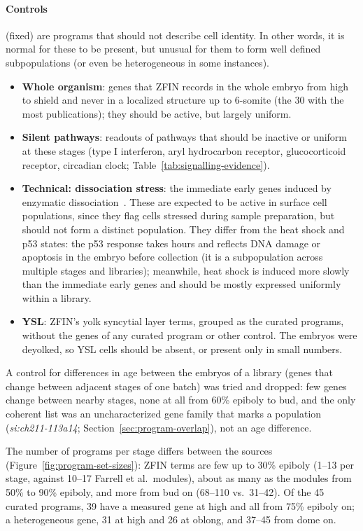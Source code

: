 \documentclass[11pt,a4paper]{article}
\begin{document}
\paragraph{Controls} (fixed) are programs that should not describe cell identity. In other words, it is normal for these to be present, but unusual for them to form well defined subpopulations (or even be heterogeneous in some instances). 
\begin{itemize}
	\item \textbf{Whole organism}: genes that ZFIN records in the whole embryo from high to shield and never in a localized structure up to 6-somite (the 30 with the most publications); they should be active, but largely uniform.
	\item \textbf{Silent pathways}: readouts of pathways that should be inactive or uniform at these stages (type I interferon, aryl hydrocarbon receptor, glucocorticoid receptor, circadian clock; Table~\ref{tab:signalling-evidence}).
	\item \textbf{Technical: dissociation stress}: the immediate early genes induced by enzymatic dissociation~\cite{vandenbrink2017}. These are expected to be active in surface cell populations, since they flag cells stressed during sample preparation, but should not form a distinct population. They differ from the heat shock and p53 states: the p53 response takes hours and reflects DNA damage or apoptosis in the embryo before collection (it is a subpopulation across multiple stages and libraries);  meanwhile, heat shock is induced more slowly than the immediate early genes and should be mostly expressed uniformly within a library.
	\item \textbf{YSL}: ZFIN's yolk syncytial layer terms, grouped as the curated programs, without the genes of any curated program or other control. The embryos were deyolked, so YSL cells should be absent, or present only in small numbers.
\end{itemize}
A control for differences in age between the embryos of a library (genes that change between adjacent stages of one batch) was tried and dropped: few genes change between nearby stages, none at all from 60\% epiboly to bud, and the only coherent list was an uncharacterized gene family that marks a population (\emph{si:ch211-113a14}; Section~\ref{sec:program-overlap}), not an age difference.

The number of programs per stage differs between the sources (Figure~\ref{fig:program-set-sizes}): ZFIN terms are few up to 30\% epiboly (1--13 per stage, against 10--17 Farrell et al.\ modules), about as many as the modules from 50\% to 90\% epiboly, and more from bud on (68--110 vs.\ 31--42). Of the 45 curated programs, 39 have a measured gene at high and all from 75\% epiboly on; a heterogeneous gene, 31 at high and 26 at oblong, and 37--45 from dome on.
\end{document}
